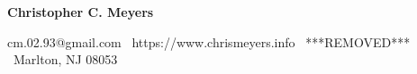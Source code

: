 
\begin{center}
{\LARGE \textbf{Christopher C. Meyers}}
\end{center}
\begin{center}
cm.02.93@gmail.com \textbullet \  https://www.chrismeyers.info \textbullet \ ***REMOVED*** \textbullet \ Marlton, NJ 08053
\end{center}
